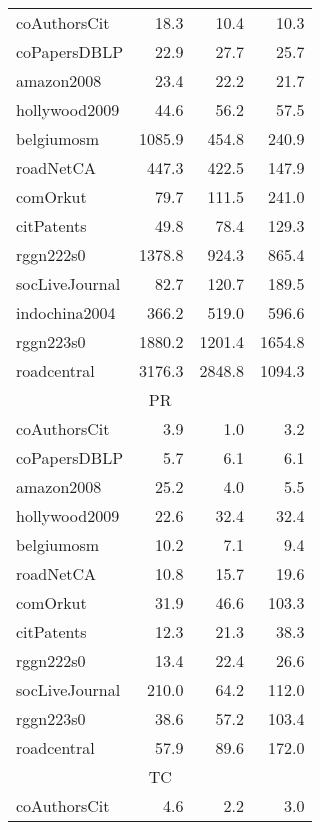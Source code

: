 \begin{table}[tbp]
\begin{center}
\begin{tabular}{|l|r|r|r|}
    \hline
    \rowcolor{black!10} coAuthorsCit&18.3&10.4&10.3\\
    \rowcolor{black!2 } coPapersDBLP&22.9&27.7&25.7\\
    \rowcolor{black!10} amazon2008&23.4&22.2&21.7\\
    \rowcolor{black!2 } hollywood2009&44.6&56.2&57.5\\
    \rowcolor{black!10} belgiumosm&1085.9&454.8&240.9\\
    \rowcolor{black!2 } roadNetCA&447.3&422.5&147.9\\
    \rowcolor{black!10} comOrkut&79.7&111.5&241.0\\
    \rowcolor{black!2 } citPatents&49.8&78.4&129.3\\
    \rowcolor{black!10} rggn222s0&1378.8&924.3&865.4\\
    \rowcolor{black!2 } socLiveJournal&82.7&120.7&189.5\\
    \rowcolor{black!10} indochina2004&366.2&519.0&596.6\\
    \rowcolor{black!2 } rggn223s0&1880.2&1201.4&1654.8\\
    \rowcolor{black!10} roadcentral&3176.3&2848.8&1094.3\\
    \hline
    \hline
    \multicolumn{4}{|c|}{PR} \\
    \hline
    \rowcolor{black!10} coAuthorsCit&3.9&1.0&3.2\\
    \rowcolor{black!2 } coPapersDBLP&5.7&6.1&6.1\\
    \rowcolor{black!10} amazon2008&25.2&4.0&5.5\\
    \rowcolor{black!2 } hollywood2009&22.6&32.4&32.4\\
    \rowcolor{black!10} belgiumosm&10.2&7.1&9.4\\
    \rowcolor{black!2 } roadNetCA&10.8&15.7&19.6\\
    \rowcolor{black!10} comOrkut&31.9&46.6&103.3\\
    \rowcolor{black!2 } citPatents&12.3&21.3&38.3\\
    \rowcolor{black!10} rggn222s0&13.4&22.4&26.6\\
    \rowcolor{black!2 } socLiveJournal&210.0&64.2&112.0\\
    \rowcolor{black!10} rggn223s0&38.6&57.2&103.4\\
    \rowcolor{black!2 } roadcentral&57.9&89.6&172.0\\
    \hline
    \hline
    \multicolumn{4}{|c|}{TC} \\
    \hline
    \rowcolor{black!10} coAuthorsCit&4.6&2.2&3.0\\

\end{tabular}
\end{center}
\end{table}
